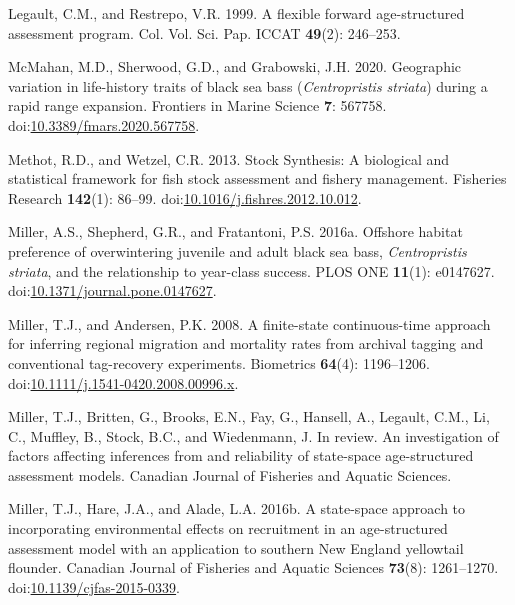 \documentclass[
]{article}
\newlength{\cslhangindent}
\newlength{\cslentryspacingunit} %
\newenvironment{CSLReferences}[2] %
 {%
  \setlength{\parindent}{0pt}
  \ifodd #1
  \let\oldpar\par
  \def\par{\hangindent=\cslhangindent\oldpar}
  \fi
  \setlength{\parskip}{#2\cslentryspacingunit}
 }%
 {}
\begin{document}
\begin{CSLReferences}{1}{0}
\leavevmode{}%
Legault, C.M., and Restrepo, V.R. 1999. A flexible forward age-structured assessment program. Col. Vol. Sci. Pap. ICCAT \textbf{49}(2): 246--253.

\leavevmode{}%
McMahan, M.D., Sherwood, G.D., and Grabowski, J.H. 2020. Geographic variation in life-history traits of black sea bass (\emph{{C}entropristis striata}) during a rapid range expansion. Frontiers in Marine Science \textbf{7}: 567758. doi:\href{https://doi.org/10.3389/fmars.2020.567758}{10.3389/fmars.2020.567758}.

\leavevmode{}%
Methot, R.D., and Wetzel, C.R. 2013. Stock {S}ynthesis: A biological and statistical framework for fish stock assessment and fishery management. Fisheries Research \textbf{142}(1): 86--99. doi:\href{https://doi.org/10.1016/j.fishres.2012.10.012}{10.1016/j.fishres.2012.10.012}.

\leavevmode{}%
Miller, A.S., Shepherd, G.R., and Fratantoni, P.S. 2016a. Offshore habitat preference of overwintering juvenile and adult black sea bass, \emph{{C}entropristis} \emph{striata}, and the relationship to year-class success. {PLOS} {ONE} \textbf{11}(1): e0147627. doi:\href{https://doi.org/10.1371/journal.pone.0147627}{10.1371/journal.pone.0147627}.

\leavevmode{}%
Miller, T.J., and Andersen, P.K. 2008. A finite-state continuous-time approach for inferring regional migration and mortality rates from archival tagging and conventional tag-recovery experiments. Biometrics \textbf{64}(4): 1196--1206. doi:\href{https://doi.org/10.1111/j.1541-0420.2008.00996.x}{10.1111/j.1541-0420.2008.00996.x}.

\leavevmode{}%
Miller, T.J., Britten, G., Brooks, E.N., Fay, G., Hansell, A., Legault, C.M., Li, C., Muffley, B., Stock, B.C., and Wiedenmann, J. In review. An investigation of factors affecting inferences from and reliability of state-space age-structured assessment models. Canadian Journal of Fisheries and Aquatic Sciences.

\leavevmode{}%
Miller, T.J., Hare, J.A., and Alade, L.A. 2016b. A state-space approach to incorporating environmental effects on recruitment in an age-structured assessment model with an application to southern {New England} yellowtail flounder. Canadian Journal of Fisheries and Aquatic Sciences \textbf{73}(8): 1261--1270. doi:\href{https://doi.org/10.1139/cjfas-2015-0339}{10.1139/cjfas-2015-0339}.


\end{CSLReferences}
\end{document}
